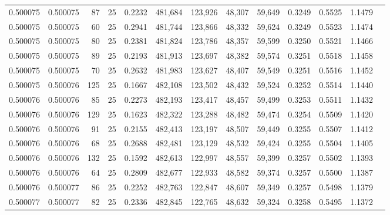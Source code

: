 \begin{tabular}{rrrrrrrrrrrrr}
0.500075 & 0.500075 &    87 &  25 &                                     0.2232 & 481,684 & 123,926 &  48,307 &  59,649 & 0.3249 & 0.5525 & 1.1479 \\
0.500075 & 0.500075 &    60 &  25 &                                     0.2941 & 481,744 & 123,866 &  48,332 &  59,624 & 0.3249 & 0.5523 & 1.1474 \\
0.500075 & 0.500075 &    80 &  25 &                                     0.2381 & 481,824 & 123,786 &  48,357 &  59,599 & 0.3250 & 0.5521 & 1.1466 \\
0.500075 & 0.500075 &    89 &  25 &                                     0.2193 & 481,913 & 123,697 &  48,382 &  59,574 & 0.3251 & 0.5518 & 1.1458 \\
0.500075 & 0.500075 &    70 &  25 &                                     0.2632 & 481,983 & 123,627 &  48,407 &  59,549 & 0.3251 & 0.5516 & 1.1452 \\
0.500075 & 0.500076 &   125 &  25 &                                     0.1667 & 482,108 & 123,502 &  48,432 &  59,524 & 0.3252 & 0.5514 & 1.1440 \\
0.500076 & 0.500076 &    85 &  25 &                                     0.2273 & 482,193 & 123,417 &  48,457 &  59,499 & 0.3253 & 0.5511 & 1.1432 \\
0.500076 & 0.500076 &   129 &  25 &                                     0.1623 & 482,322 & 123,288 &  48,482 &  59,474 & 0.3254 & 0.5509 & 1.1420 \\
0.500076 & 0.500076 &    91 &  25 &                                     0.2155 & 482,413 & 123,197 &  48,507 &  59,449 & 0.3255 & 0.5507 & 1.1412 \\
0.500076 & 0.500076 &    68 &  25 &                                     0.2688 & 482,481 & 123,129 &  48,532 &  59,424 & 0.3255 & 0.5504 & 1.1405 \\
0.500076 & 0.500076 &   132 &  25 &                                     0.1592 & 482,613 & 122,997 &  48,557 &  59,399 & 0.3257 & 0.5502 & 1.1393 \\
0.500076 & 0.500076 &    64 &  25 &                                     0.2809 & 482,677 & 122,933 &  48,582 &  59,374 & 0.3257 & 0.5500 & 1.1387 \\
0.500076 & 0.500077 &    86 &  25 &                                     0.2252 & 482,763 & 122,847 &  48,607 &  59,349 & 0.3257 & 0.5498 & 1.1379 \\
0.500077 & 0.500077 &    82 &  25 &                                     0.2336 & 482,845 & 122,765 &  48,632 &  59,324 & 0.3258 & 0.5495 & 1.1372 \\

\end{tabular}
